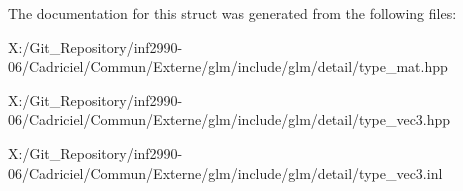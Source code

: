 The documentation for this struct was generated from the following files\-:\begin{DoxyCompactItemize}
\item 
X\-:/\-Git\-\_\-\-Repository/inf2990-\/06/\-Cadriciel/\-Commun/\-Externe/glm/include/glm/detail/type\-\_\-mat.\-hpp\item 
X\-:/\-Git\-\_\-\-Repository/inf2990-\/06/\-Cadriciel/\-Commun/\-Externe/glm/include/glm/detail/type\-\_\-vec3.\-hpp\item 
X\-:/\-Git\-\_\-\-Repository/inf2990-\/06/\-Cadriciel/\-Commun/\-Externe/glm/include/glm/detail/type\-\_\-vec3.\-inl\end{DoxyCompactItemize}
